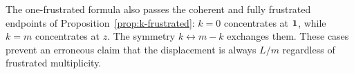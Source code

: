 The one-frustrated formula also passes the coherent and fully frustrated
endpoints of Proposition~\ref{prop:k-frustrated}: $k=0$ concentrates at
$\mathbf 1$, while $k=m$ concentrates at $z$.  The symmetry
$k\leftrightarrow m-k$ exchanges them.  These cases prevent an erroneous
claim that the displacement is always $L/m$ regardless of frustrated
multiplicity.
